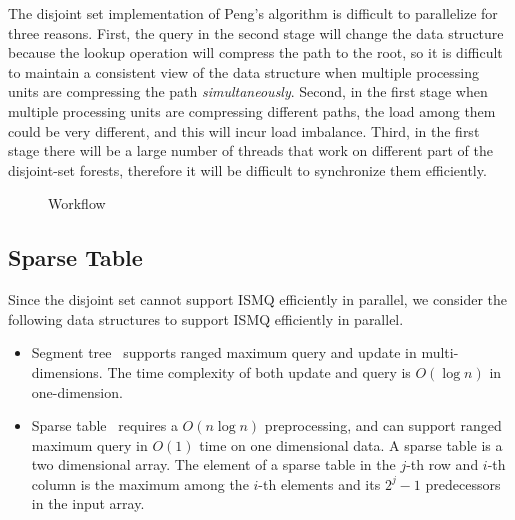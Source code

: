 The disjoint set implementation of Peng's algorithm is difficult to
parallelize for three reasons.  First, the query in the second stage
will change the data structure because the lookup operation will
compress the path to the root, so it is difficult to maintain a
consistent view of the data structure when multiple processing units
are compressing the path {\em simultaneously}.  Second, in the first
stage when multiple processing units are compressing different paths,
the load among them could be very different, and this will incur load
imbalance.  Third, in the first stage there will be a large number of
threads that work on different part of the disjoint-set forests,
therefore it will be difficult to synchronize them efficiently.


\begin{figure}[!thb]
  \centering
  \caption{Workflow}
\end{figure}

\subsection{Sparse Table}

Since the disjoint set cannot support ISMQ efficiently in parallel, we
consider the following data structures to support ISMQ efficiently in
parallel.

\begin{itemize}
  \item Segment tree~\cite{berg2000computational} supports ranged
    maximum query and update in multi-dimensions.  The time complexity
    of both update and query is $O(\log n)$ in one-dimension.
  \item Sparse table~\cite{Berkman1993RecursiveSP} requires a $O(n
    \log n)$ preprocessing, and can support ranged maximum query in
    $O(1)$ time on one dimensional data.  A sparse table is a two
    dimensional array.  The element of a sparse table in the $j$-th
    row and $i$-th column is the maximum among the $i$-th elements
    and its $2^j - 1$ predecessors in the input array.
\end{itemize}

